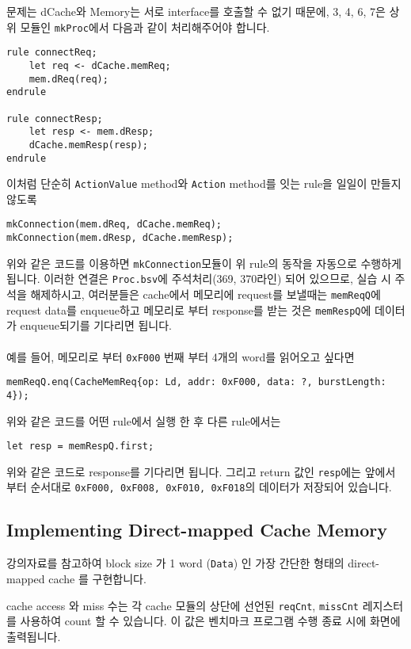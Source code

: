 \documentclass{article}
\begin{document}
\noindent 문제는 dCache와 Memory는 서로 interface를 호출할 수 없기 때문에, 3, 4, 6, 7은 상위 모듈인 \texttt{mkProc}에서 다음과 같이 처리해주어야 합니다.

\begin{Verbatim}[frame=single]
rule connectReq;
	let req <- dCache.memReq;
	mem.dReq(req);	
endrule

rule connectResp;
	let resp <- mem.dResp;
	dCache.memResp(resp);
endrule
\end{Verbatim}
\noindent 이처럼 단순히 \texttt{ActionValue} method와 \texttt{Action} method를 잇는 rule을 일일이 만들지 않도록 

\begin{Verbatim}[frame=single]
mkConnection(mem.dReq, dCache.memReq);
mkConnection(mem.dResp, dCache.memResp);
\end{Verbatim}

\noindent 위와 같은 코드를 이용하면 \texttt{mkConnection}모듈이 위 rule의 동작을 자동으로 수행하게 됩니다.
이러한 연결은 \texttt{Proc.bsv}에 주석처리(369, 370라인) 되어 있으므로, 실습 시 주석을 해제하시고, 여러분들은 cache에서 메모리에 request를 보낼때는
\texttt{memReqQ}에 request data를 enqueue하고 메모리로 부터 response를 받는 것은 \texttt{memRespQ}에 데이터가 enqueue되기를 기다리면 됩니다.
\\\\
예를 들어, 메모리로 부터 \texttt{0xF000} 번째 부터 4개의 word를 읽어오고 싶다면

\begin{Verbatim}
memReqQ.enq(CacheMemReq{op: Ld, addr: 0xF000, data: ?, burstLength: 4});
\end{Verbatim}
위와 같은 코드를 어떤 rule에서 실행 한 후 다른 rule에서는

\begin{Verbatim}
let resp = memRespQ.first;
\end{Verbatim}
위와 같은 코드로 response를 기다리면 됩니다. 그리고 return 값인 \texttt{resp}에는 앞에서 부터 순서대로 \texttt{0xF000, 0xF008, 0xF010, 0xF018}의 데이터가 저장되어 있습니다.


\subsection{Implementing Direct-mapped Cache Memory}
강의자료를 참고하여 block size 가 1 word (\texttt{Data}) 인
가장 간단한 형태의 direct-mapped cache 를 구현합니다.

cache access 와 miss 수는 각 cache 모듈의 상단에 선언된
\texttt{reqCnt}, \texttt{missCnt} 레지스터를 사용하여 count 할 수 있습니다.
이 값은 벤치마크 프로그램 수행 종료 시에 화면에 출력됩니다.
\end{document}
